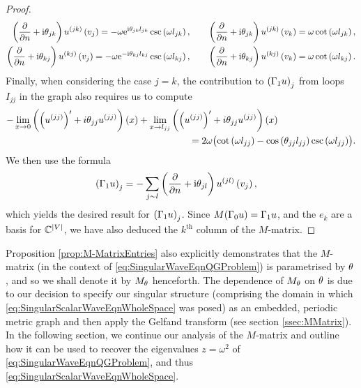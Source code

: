 \begin{proof}
\begin{align*}
		\left( \dfrac{\partial }{\partial n}+\mathrm{i}\theta_{jk} \right)u^{(jk)}\left( v_j \right) = -\omega \mathrm{e}^{\mathrm{i}\theta_{jk}l_{jk}}\csc\left( \omega l_{jk} \right), 
		&\qquad \left( \dfrac{\partial }{\partial n}+\mathrm{i}\theta_{jk} \right)u^{(jk)}\left( v_k \right) = \omega\cot\left( \omega l_{jk} \right), \\
		\left( \dfrac{\partial }{\partial n}+\mathrm{i}\theta_{kj} \right)u^{(kj)}\left( v_j \right) = -\omega \mathrm{e}^{-\mathrm{i}\theta_{kj}l_{kj}}\csc\left( \omega l_{kj} \right), 
		&\qquad \left( \dfrac{\partial }{\partial n}+\mathrm{i}\theta_{kj} \right)u^{(kj)}\left( v_k \right) = \omega\cot\left( \omega l_{kj} \right).
	\end{align*}
	Finally, when considering the case $j=k$, the contribution to $\left( \Gamma_1 u \right)_j$ from loops $I_{jj}$ in the graph also requires us to compute
	\begin{align*}
		-\lim_{x\rightarrow0}\left( \left( u^{(jj)} \right)'+i\theta_{jj}u^{(jj)} \right)(x) + \lim_{x\rightarrow l_{jj}} & \left( \left( u^{(jj)} \right)'+i\theta_{jj}u^{(jj)} \right)(x) \\
		&\qquad = 2\omega\bigl( \cot\left( \omega l_{jj} \right) - \cos\left( \theta_{jj}l_{jj} \right)\csc\left( \omega l_{jj} \right) \bigr).	
	\end{align*}
	We then use the formula
	\begin{align*}
		\left( \Gamma_1 u \right)_j &= -\sum_{j\sim l} \left( \dfrac{\partial }{\partial n}+\mathrm{i}\theta_{jl} \right)u^{(jl)}\left( v_j \right),
	\end{align*}
	which yields the desired result for $\left( \Gamma_1 u \right)_j$.
	Since $M(\Gamma_0 u) = \Gamma_1 u$, and the $e_k$ are a basis for $\mathbb{C}^{\left\lvert V \right\rvert}$, we have also deduced the $k^{\text{th}}$ column of the $M$-matrix.
\end{proof}
Proposition \ref{prop:M-MatrixEntries} also explicitly demonstrates that the $M$-matrix (in the context of \eqref{eq:SingularWaveEqnQGProblem}) is parametrised by $\theta$, and so we shall denote it by $M_{\theta}$ henceforth.
The dependence of $M_\theta$ on $\theta$ is due to our decision to specify our singular structure (comprising the domain in which \eqref{eq:SingularScalarWaveEqnWholeSpace} was posed) as an embedded, periodic metric graph and then apply the Gelfand transform (see section \ref{ssec:MMatrix}).
In the following section, we continue our analysis of the $M$-matrix and outline how it can be used to recover the eigenvalues $z=\omega^2$ of \eqref{eq:SingularWaveEqnQGProblem}, and thus \eqref{eq:SingularScalarWaveEqnWholeSpace}.

